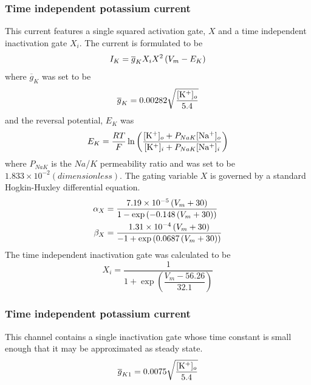 \subsubsection{Time independent potassium current}
This current features a single squared activation gate, $X$ and a
time independent inactivation gate $X_i$. The current is formulated to be
\begin{equation}
  I_K = \overline{g}_{K}X_iX^2\left( V_m-E_K \right)
\end{equation}
where $\overline{g}_{K}$ was  set to be
\begin{equation}
  \overline{g}_{K}=0.00282\sqrt{\dfrac{ [\mathrm{K^+}]_{o} }{5.4}}
\end{equation}
and the reversal potential, $E_K$ was
\begin{equation}
  E_K =
  \dfrac{RT}{F}\ln\left( \dfrac{ [\mathrm{K^+}]_{o} +P_{NaK} [\mathrm{Na^+}]_{o} }
  { [\mathrm{K^+}]_{i} +P_{NaK} [\mathrm{Na^+}]_{i} } \right)
\end{equation}
where $P_{NaK}$ is the $Na$/$K$ permeability ratio and was set to be $1.833
\times 10^{-2} (dimensionless)$. The gating variable $X$ is governed by a
standard Hogkin-Huxley differential equation.
\begin{gather}
  \label{eqn:lr2_ik_coeffs}
  \begin{aligned}
    \alpha_X &= \dfrac{7.19\times 10^{-5} \left( V_m + 30 \right)}{1 - \exp
      \left( -0.148
     \left( V_m + 30 \right) \right)} \\
    \beta_X &= \dfrac{1.31\times 10^{-4} \left( V_m + 30 \right)}{-1 + \exp \left( 0.0687
     \left( V_m + 30 \right) \right)}
  \end{aligned}
\end{gather}
The time independent inactivation gate was calculated to be
\begin{equation}
  \label{eqn:lr2_ik_xi}
  X_i = \dfrac{1}{1 + \exp \left( \dfrac{V_m - 56.26}{32.1} \right)}
\end{equation}
%
\subsubsection{Time independent potassium current}
This channel contains a single inactivation gate whose time constant is small
enough that it may be approximated as steady state.
\begin{equation}
  \overline{g}_{K1} = 0.0075\sqrt{\dfrac{ [\mathrm{K^+}]_{o} }{5.4}}
\end{equation}

